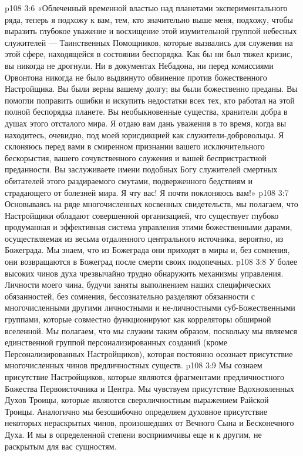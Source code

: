\vs p108 3:6 «Облеченный временной властью над планетами экспериментального ряда, теперь я подхожу к вам, тем, кто значительно выше меня, подхожу, чтобы выразить глубокое уважение и восхищение этой изумительной группой небесных служителей --- Таинственных Помощников, которые вызвались для служения на этой сфере, находящейся в состоянии беспорядка. Как бы ни был тяжел кризис, вы никогда не дрогнули. Ни в документах Небадона, ни перед комиссиями Орвонтона никогда не было выдвинуто обвинение против божественного Настройщика. Вы были верны вашему долгу; вы были божественно преданы. Вы помогли поправить ошибки и искупить недостатки всех тех, кто работал на этой полной беспорядка планете. Вы необыкновенные существа, хранители добра в душах этого отсталого мира. Я отдаю вам дань уважения в то время, когда вы находитесь, очевидно, под моей юрисдикцией как служители\hyp{}добровольцы. Я склоняюсь перед вами в смиренном признании вашего исключительного бескорыстия, вашего сочувственного служения и вашей беспристрастной преданности. Вы заслуживаете имени подобных Богу служителей смертных обитателей этого раздираемого смутами, подверженного бедствиям и страдающего от болезней мира. Я чту вас! Я почти поклоняюсь вам!»
\vs p108 3:7 \pc Основываясь на ряде многочисленных косвенных свидетельств, мы полагаем, что Настройщики обладают совершенной организацией, что существует глубоко продуманная и эффективная система управления этими божественными дарами, осуществляемая из весьма отдаленного центрального источника, вероятно, из Божеграда. Мы знаем, что из Божеграда они приходят в миры и, без сомнения, они возвращаются в Божеград после смерти своих подопечных.
\vs p108 3:8 У более высоких чинов духа чрезвычайно трудно обнаружить механизмы управления. Личности моего чина, будучи заняты выполнением наших специфических обязанностей, без сомнения, бессознательно разделяют обязанности с многочисленными другими личностными и не\hyp{}личностными суб\hyp{}Божественными группами, которые совместно функционируют как корреляторы обширной вселенной. Мы полагаем, что мы служим таким образом, поскольку мы являемся единственной группой персонализированных созданий (кроме Персонализированных Настройщиков), которая постоянно осознает присутствие многочисленных чинов предличностных существ.
\vs p108 3:9 Мы сознаем присутствие Настройщиков, которые являются фрагментами предличностного Божества Первоисточника и Центра. Мы чувствуем присутствие Вдохновленных Духов Троицы, которые являются сверхличностным выражением Райской Троицы. Аналогично мы безошибочно определяем духовное присутствие некоторых нераскрытых чинов, произошедших от Вечного Сына и Бесконечного Духа. И мы в определенной степени восприимчивы еще и к другим, не раскрытым для вас сущностям.
